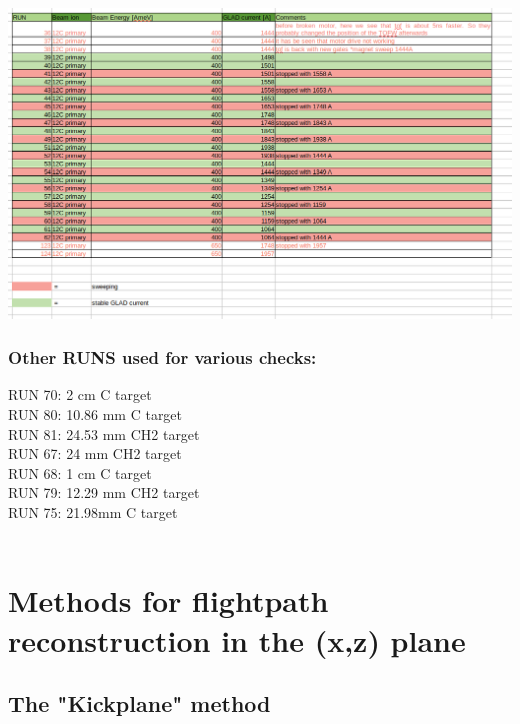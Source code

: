\documentclass[12pt, letterpaper]{article}
\begin{document}
\begin{center}
	\includegraphics[width=1.0\textwidth]{runs_screenshot.png}
\end{center}

\subsubsection{Other RUNS used for various checks:}
RUN 70: 2 cm C target\\
RUN 80: 10.86 mm C target\\
RUN 81: 24.53 mm CH2 target\\
RUN 67: 24 mm CH2 target \\
RUN 68: 1 cm C target \\
RUN 79: 12.29 mm CH2 target\\
RUN 75: 21.98mm C target\\
\\

\section{Methods for flightpath reconstruction in the (x,z) plane}
\subsection{The "Kickplane" method}
\end{document}
